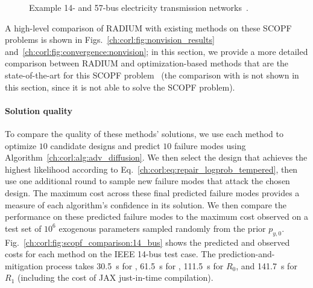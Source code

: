 \begin{figure}[tb]
\begin{subfigure}[t]{0.4\linewidth}
    \end{subfigure}%
    \caption{Example 14- and 57-bus electricity transmission networks~\cite{illinoiscenterforasmarterelectricgridIEEE57BusSystem}.}
    \label{ch:corl:fig:networks}
\end{figure}

A high-level comparison of RADIUM with existing methods on these SCOPF problems is shown in Figs.~\ref{ch:corl:fig:nonvision_results} and~\ref{ch:corl:fig:convergence:nonvision}; in this section, we provide a more detailed comparison between RADIUM and optimization-based methods that are the state-of-the-art for this SCOPF problem~\cite{dontiAdversariallyRobustLearning2021} (the comparison with \ltc{} is not shown in this section, since it is not able to solve the SCOPF problem).

\paragraph{Solution quality} To compare the quality of these methods' solutions, we use each method to optimize $10$ candidate designs and predict $10$ failure modes using Algorithm~\ref{ch:corl:alg:adv_diffusion}. We then select the design that achieves the highest likelihood according to Eq.~\eqref{ch:corl:eq:repair_logprob_tempered}, then use one additional round to sample new failure modes that attack the chosen design. The maximum cost across these final predicted failure modes provides a measure of each algorithm's confidence in its solution. We then compare the performance on these predicted failure modes to the maximum cost observed on a test set of $10^6$ exogenous parameters sampled randomly from the prior $p_{y, 0}$. Fig.~\ref{ch:corl:fig:scopf_comparison:14_bus} shows the predicted and observed costs for each method on the IEEE 14-bus test case. The prediction-and-mitigation process takes \SI{30.5}{s} for \gdr{}, \SI{61.5}{s} for \gda{}, \SI{111.5}{s} for $R_0$, and \SI{141.7}{s} for $R_1$ (including the cost of JAX just-in-time compilation).

